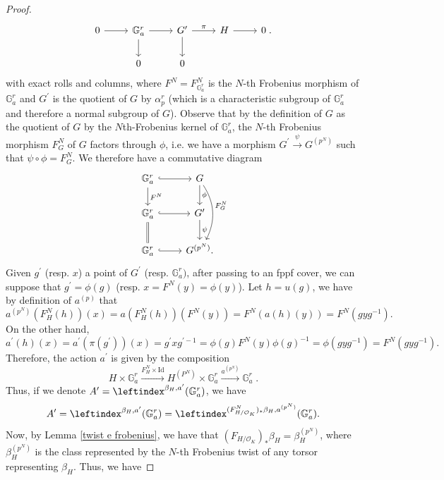 \documentclass[a4paper,english,12pt]{amsart}
\numberwithin{equation}{section}
\renewcommand{\_}{\rule{0.25cm}{0.4pt}}
\begin{document}
\begin{proof}
\[\begin{tikzcd}
        0\ar[r] & \mathbb{G}_{a}^{r}\ar[r]\ar[d] & G^{\prime}\ar[r, "\pi"]\ar[d] & H\ar[r] & 0\;.
        \\
        & 0 & 0
    \end{tikzcd}
    \]
     with exact rolls and columns, where $F^{N}=F^{N}_{\mathbb{G}_{a}^{r}}$ is the $N$-th Frobenius morphism of $\mathbb{G}_{a}^{r}$ and $G^{\prime}$ is the quotient of $G$ by $\alpha_{p}^{r}$ (which is a characteristic subgroup of $\mathbb{G}_{a}^{r}$ and therefore a normal subgroup of $G$). Observe that by the definition of $G$ as the quotient of $G$ by the $N$th-Frobenius kernel of $\mathbb{G}_{a}^{r}$, the $N$-th Frobenius morphism $F^{N}_{G}$ of $G$ factors through $\phi$, i.e. we have a morphism $G^{\prime}\xrightarrow{\psi} G^{(p^{N})}$ such that $\psi\circ\phi=F^{N}_{G}$. We therefore have a commutative diagram
    \[
    \begin{tikzcd}
        \mathbb{G}_{a}^{r}\ar[r, hook]\ar[d, "F^{N}"] & G\ar[d, "\phi"]\ar[dd, bend left, "F^{N}_{G}"]
        \\
        \mathbb{G}_{a}^{r}\ar[r, hook]\ar[d, equal] & G^{\prime}\ar[d, "\psi"]
        \\
        \mathbb{G}_{a}^{r}\ar[r, hook] & G^{(p^{N})}.
    \end{tikzcd}
    \]
    Given $g^{\prime}$ (resp. $x$) a point of $G^{\prime}$ (resp. $\mathbb{G}_{a}^{r})$, after passing to an fppf cover, we can suppose that $g^{\prime}=\phi(g)$ (resp. $x=F^{N}(y)=\phi(y)$). Let $h=u(g)$, we have by definition of $a^{(p)}$ that
    \[
    a^{(p^{N})}(F_{H}^{N}(h))(x)=a(F_{H}^{N}(h))(F^{N}(y))=F^{N}(a(h)(y))=F^{N}(gyg^{-1}).
    \]
    On the other hand,
    \[
    a^{\prime}(h)(x)=a^{\prime}(\pi(g^{\prime}))(x)=g^{\prime}xg^{\prime -1}=\phi(g)F^{N}(y)\phi(g)^{-1}=\phi(gyg^{-1})=F^{N}(gyg^{-1}).
    \]
    Therefore, the action $a^{\prime}$ is given by the composition
    \[
    H\times\mathbb{G}_{a}^{r}\xrightarrow{F_{H}^{N}\times \text{Id}} H^{(P^{N})}\times\mathbb{G}_{a}^{r}\xrightarrow{a^{(p^N)}} \mathbb{G}_{a}^{r}\;.
    \] 
    Thus, if we denote $A^{\prime}=\leftindex^{\beta_{H},a^{\prime}}(\mathbb{G}_{a}^{r})$, we have
    \[
    A^{\prime}=\leftindex^{\beta_{H},a^{\prime}}(\mathbb{G}_{a}^{r})=\leftindex^{(F_{H/\mathcal{O}_{K}}^{N})_{\ast}\beta_{H},a^{(p^{N})}}(\mathbb{G}_{a}^{r}).
    \]
    Now, by Lemma \ref{twist e frobenius}, we have that $(F_{H/\mathcal{O}_{K}})_{\ast}\beta_{H}=\beta_{H}^{(p^{N})}$, where $\beta_{H}^{(p^{N})}$ is the class represented by the $N$-th Frobenius twist of any torsor representing $\beta_{H}$. Thus, we have

\end{proof}
\end{document}
